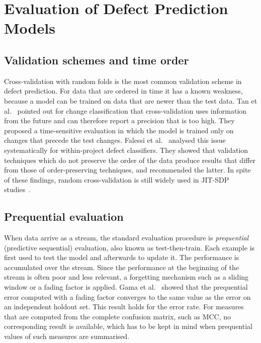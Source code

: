\documentclass[12pt,a4paper,oneside]{report}
\begin{document}
\section{Evaluation of Defect Prediction Models}

\subsection{Validation schemes and time order}

Cross-validation with random folds is the most common validation scheme in
defect prediction. For data that are ordered in time it has a known weakness,
because a model can be trained on data that are newer than the test data. Tan
et al.~\cite{tan2015online} pointed out for change classification that
cross-validation uses information from the future and can therefore report a
precision that is too high. They proposed a time-sensitive evaluation in
which the model is trained only on changes that precede the test changes.
Falessi et al.~\cite{falessi2020order} analysed this issue systematically for
within-project defect classifiers. They showed that validation techniques
which do not preserve the order of the data produce results that differ from
those of order-preserving techniques, and recommended the latter. In spite of
these findings, random cross-validation is still widely used in JIT-SDP
studies~\cite{zhao2023survey}.

\subsection{Prequential evaluation}

When data arrive as a stream, the standard evaluation procedure is
\emph{prequential} (predictive sequential) evaluation, also known as
test-then-train. Each example is first used to test the model and afterwards
to update it. The performance is accumulated over the stream. Since the
performance at the beginning of the stream is often poor and less relevant, a
forgetting mechanism such as a sliding window or a fading factor is applied.
Gama et al.~\cite{gama2013prequential} showed that the prequential error
computed with a fading factor converges to the same value as the error on an
independent holdout set. This result holds for the error rate. For measures
that are computed from the complete confusion matrix, such as MCC, no
corresponding result is available, which has to be kept in mind when
prequential values of such measures are summarised.
\end{document}
